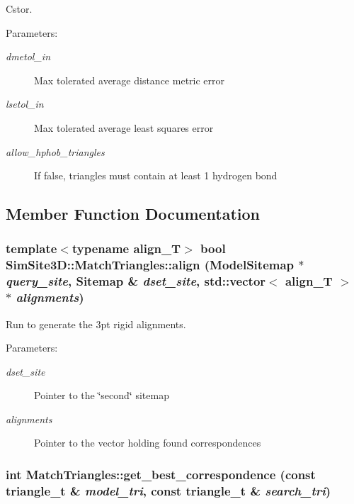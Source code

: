 Cstor. 

\begin{Desc}
\item[Parameters:]
\begin{description}
\item[{\em dmetol\_\-in}]Max tolerated average distance metric error \item[{\em lsetol\_\-in}]Max tolerated average least squares error \item[{\em allow\_\-hphob\_\-triangles}]If false, triangles must contain at least 1 hydrogen bond \end{description}
\end{Desc}


\subsection{Member Function Documentation}
\subsubsection{\setlength{\rightskip}{0pt plus 5cm}template$<$typename align\_\-T$>$ bool SimSite3D::Match\-Triangles::align (\bf{Model\-Sitemap} $\ast$ {\em query\_\-site}, \bf{Sitemap} \& {\em dset\_\-site}, std::vector$<$ align\_\-T $>$ $\ast$ {\em alignments})\hspace{0.3cm}{\tt  [inline]}}\label{classSimSite3D_1_1MatchTriangles_e1a93a3866983cd03a85ebc19cca5908}


Run to generate the 3pt rigid alignments. 

\begin{Desc}
\item[Parameters:]
\begin{description}
\item[{\em dset\_\-site}]Pointer to the \char`\"{}second\char`\"{} sitemap \item[{\em alignments}]Pointer to the vector holding found correspondences \end{description}
\end{Desc}
\subsubsection{\setlength{\rightskip}{0pt plus 5cm}int Match\-Triangles::get\_\-best\_\-correspondence (const \bf{triangle\_\-t} \& {\em model\_\-tri}, const \bf{triangle\_\-t} \& {\em search\_\-tri})\hspace{0.3cm}{\tt  [private]}}\label{classSimSite3D_1_1MatchTriangles_90fabfb57f81c9a8366434de82984762}


